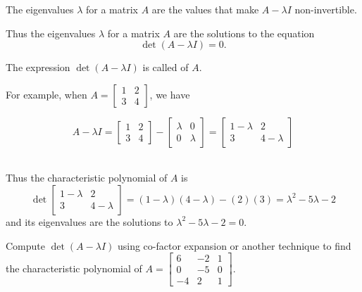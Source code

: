 \begin{applicationActivities}
\begin{fact}
  The eigenvalues \(\lambda\) for a matrix \(A\) are the values
  that make \(A-\lambda I\) non-invertible.

  \vspace{1em}

  Thus the eigenvalues \(\lambda\) for a matrix \(A\)
  are the solutions to
  the equation \[\det(A-\lambda I)=0.\]
\end{fact}

\begin{definition}
The expression \(\det(A-\lambda I)\) is called
 of \(A\). \\

\vspace{1em} 

For example, when
\(A=\begin{bmatrix}1 & 2 \\ 3 & 4\end{bmatrix}\), we have

\[
  A-\lambda I=
  \begin{bmatrix}1 & 2 \\ 3 & 4\end{bmatrix}-
  \begin{bmatrix}\lambda & 0 \\ 0 & \lambda\end{bmatrix}=
  \begin{bmatrix}1-\lambda & 2 \\ 3 & 4-\lambda\end{bmatrix}
\]

\ \\
Thus the characteristic polynomial of \(A\) is
\[
  \det\begin{bmatrix}1-\lambda & 2 \\ 3 & 4-\lambda\end{bmatrix}
=
  (1-\lambda)(4-\lambda)-(2)(3)
=
  \lambda^2-5\lambda-2
\]
and its eigenvalues are the solutions to \(\lambda^2-5\lambda-2=0\).
\end{definition}

\begin{activity}{10}
  Compute $\det(A-\lambda I)$ using co-factor expansion or another technique
  to find the characteristic polynomial of
  \(A=\begin{bmatrix} 6 & -2 & 1 \\ 0 & -5 & 0 \\ -4 & 2 & 1 \end{bmatrix}\).
\end{activity}


\end{applicationActivities}
